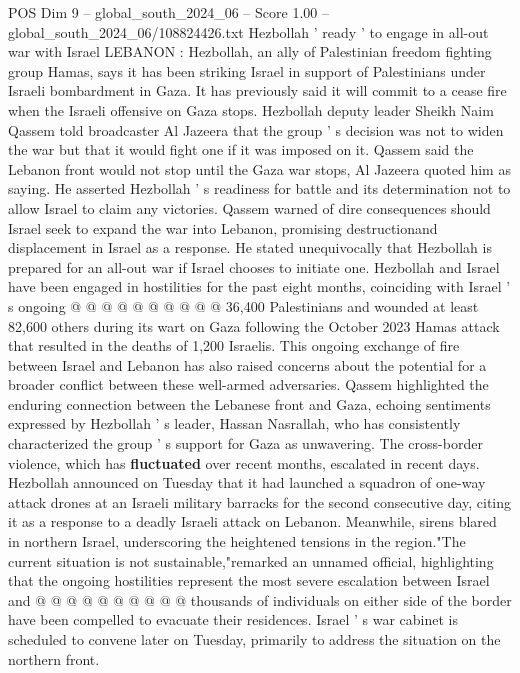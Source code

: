 \begin{textsample}{POS Dim 9 – global\_south\_2024\_06 – Score 1.00 – global\_south\_2024\_06/108824426.txt}  \label{ex:f9_pos_089}
Hezbollah ' ready ' to engage in all-out war with Israel LEBANON : Hezbollah, an ally of Palestinian freedom fighting group Hamas, says it has been striking Israel in support of Palestinians under Israeli bombardment in Gaza.
It has previously said it will commit to a cease fire when the Israeli offensive on Gaza stops.
Hezbollah deputy leader Sheikh Naim Qassem told broadcaster Al Jazeera that the group ' s decision was not to widen the war but that it would fight one if it was imposed on it.
Qassem said the Lebanon front would not stop until the Gaza war stops, Al Jazeera quoted him as saying.
He asserted Hezbollah ' s readiness for battle and its determination not to allow Israel to claim any victories.
Qassem warned of dire consequences should Israel seek to expand the war into Lebanon, promising destructionand displacement in Israel as a response.
He stated unequivocally that Hezbollah is prepared for an all-out war if Israel chooses to initiate one.
Hezbollah and Israel have been engaged in hostilities for the past eight months, coinciding with Israel ' s ongoing @ @ @ @ @ @ @ @ @ @ 36,400 Palestinians and wounded at least 82,600 others during its wart on Gaza following the October 2023 Hamas attack that resulted in the deaths of 1,200 Israelis.
This ongoing exchange of fire between Israel and Lebanon has also raised concerns about the potential for a broader conflict between these well-armed adversaries.
Qassem highlighted the enduring connection between the Lebanese front and Gaza, echoing sentiments expressed by Hezbollah ' s leader, Hassan Nasrallah, who has consistently characterized the group ' s support for Gaza as unwavering.
The cross-border violence, which has \textbf{fluctuated} over recent months, escalated in recent days.
Hezbollah announced on Tuesday that it had launched a squadron of one-way attack drones at an Israeli military barracks for the second consecutive day, citing it as a response to a deadly Israeli attack on Lebanon.
Meanwhile, sirens blared in northern Israel, underscoring the heightened tensions in the region."The current situation is not sustainable,"remarked an unnamed official, highlighting that the ongoing hostilities represent the most severe escalation between Israel and @ @ @ @ @ @ @ @ @ @ thousands of individuals on either side of the border have been compelled to evacuate their residences.
Israel ' s war cabinet is scheduled to convene later on Tuesday, primarily to address the situation on the northern front.

\end{textsample}
